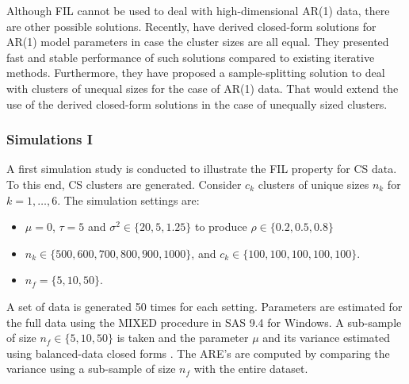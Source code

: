 \documentclass[11pt,a5paper,twoside]{book}
\begin{document}
Although FIL cannot be used to deal with high-dimensional AR(1) data, there are other possible solutions. Recently, \cite{hermans2017_ar1} have derived closed-form solutions for AR(1) model parameters in case the cluster sizes are all equal. They presented fast and stable performance of such solutions compared to existing iterative methods. Furthermore, they have proposed a sample-splitting solution to deal with clusters of unequal sizes for the case of AR(1) data. That would extend the use of the derived closed-form solutions in the case of unequally sized clusters.


\subsubsection{Simulations I}
\label{sub_sec_sim1}
A first simulation study is conducted to illustrate the FIL property for CS data. To this end, CS clusters are generated.  Consider $c_k$ clusters of unique sizes $n_k$ for $k=1,\ldots,6$. The simulation settings are:
\begin{itemize}
\item $\mu=0$, $\tau=5$ and $\sigma^2\in\{20,5,1.25\}$ to produce $\rho\in\{0.2,0.5,0.8\}$
\item $n_k\in\{500,600,700,800,900,1000\}$, and $c_k\in\{100,100,100,100,100\}$.
\item $n_f=\{5,10,50\}$. 
\end{itemize}
A set of data is generated 50 times for each setting. Parameters are estimated for the full data using the MIXED procedure in SAS 9.4 for Windows. A sub-sample of size $n_f\in\{5,10,50\}$ is taken and the parameter $\mu$ and its variance  estimated using  balanced-data closed forms \cite{Iddi2011}. The ARE's are computed by comparing the variance using a sub-sample of size $n_f$ with the entire dataset. 
\end{document}
